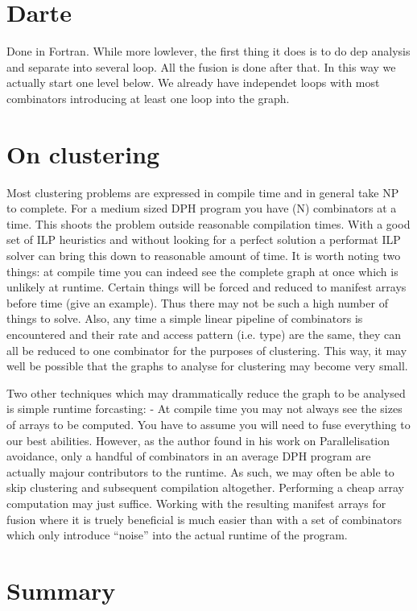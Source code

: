 \documentclass[preamble.tex]{subfiles}
\begin{document}
\section{Darte}

Done in Fortran. While more lowlever, the first thing it does is to do dep analysis and separate into several loop. All the fusion is done after that. In this way we actually start one level below. We already have independet loops with most combinators introducing at least one loop into the graph.

\section{On clustering}

Most clustering problems are expressed in compile time and in general take NP to complete. For a medium sized DPH program you have (N) combinators at a time. This shoots the problem outside reasonable compilation times. With a good set of ILP heuristics and without looking for a perfect solution a performat ILP solver can bring this down to reasonable amount of time. It is worth noting two things: at compile time you can indeed see the complete graph at once which is unlikely at runtime. Certain things will be forced and reduced to manifest arrays before time (give an example). Thus there may not be such a high number of things to solve. Also, any time a simple linear pipeline of combinators is encountered and their rate and access pattern (i.e. type) are the same, they can all be reduced to one combinator for the purposes of clustering. This way, it may well be possible that the graphs to analyse for clustering may become very small.

Two other techniques which may drammatically reduce the graph to be analysed is simple runtime forcasting:
- At compile time you may not always see the sizes of arrays to be computed. You have to assume you will need to fuse everything to our best abilities. However, as the author found in his work on Parallelisation avoidance, only a handful of combinators in an average DPH program are actually majour contributors to the runtime. As such, we may often be able to skip clustering and subsequent compilation altogether. Performing a cheap array computation may just suffice. Working with the resulting manifest arrays for fusion where it is truely beneficial is much easier than with a set of combinators which only introduce ``noise'' into the actual runtime of the program.

\section{Summary}
\end{document}
